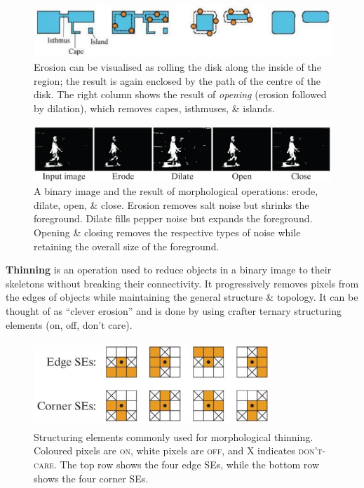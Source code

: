 \documentclass[a4paper,11pt]{article}
\begin{document}
\begin{figure}[H]
    \centering
    \includegraphics[width=\textwidth]{images/erosiionofbinaryregion.png}
    \caption{
        Erosion can be visualised as rolling the disk along the inside of the region; the result is again enclosed by the path of the centre of the disk.
        The right column shows the result of \textit{opening} (erosion followed by dilation), which removes capes, isthmuses, \& islands.
    }
\end{figure}

\begin{figure}[H]
    \centering
    \includegraphics[width=\textwidth]{images/resultofmorphologicaloperations.png}
    \caption{
        A binary image and the result of morphological operations: erode, dilate, open, \& close.
        Erosion removes salt noise but shrinks the foreground.
        Dilate fills pepper noise but expands the foreground.
        Opening \& closing removes the respective types of noise while retaining the overall size of the foreground.
    }
\end{figure}

\textbf{Thinning} is an operation used to reduce objects in a binary image to their skeletons without breaking their connectivity.
It progressively removes pixels from the edges of objects while maintaining the general structure \& topology.
It can be thought of as ``clever erosion'' and is done by using crafter ternary structuring elements (on, off, don't care).

\begin{figure}[H]
    \centering
    \includegraphics[width=0.8\textwidth]{images/thinningSEs.png}
    \caption{
        Structuring elements commonly used for morphological thinning.
        Coloured pixels are \textsc{on}, white pixels are \textsc{off}, and X indicates \textsc{don't-care}.
        The top row shows the four edge SEs, while the bottom row shows the four corner SEs.
    }
\end{figure}
\end{document}
